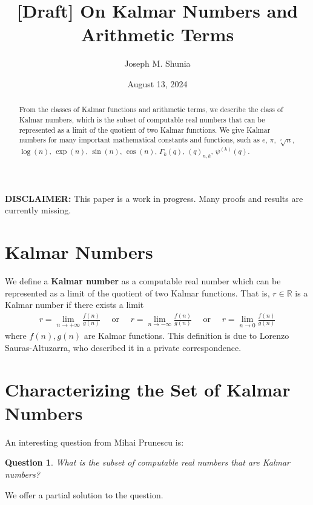 \documentclass[10pt,a4paper]{article}
\title{[Draft] On Kalmar Numbers and Arithmetic Terms}
\author{Joseph M. Shunia}
\date{August 13, 2024}
\theoremstyle{plain}
\newtheorem{question}{Question}[section]
\begin{document}
\maketitle

\begin{abstract}
\noindent From the classes of Kalmar functions and arithmetic terms, we describe the class of Kalmar numbers, which is the subset of computable real numbers that can be represented as a limit of the quotient of two Kalmar functions. We give Kalmar numbers for many important mathematical constants and functions, such as $e$, $\pi$, $\sqrt[r]{n}$, $\log(n)$, $\exp(n)$, $\sin(n)$, $\cos(n)$, $\Gamma_k(q)$, $(q)_{n,k}$, $\psi^{(k)}(q)$.
\end{abstract}

\textbf{DISCLAIMER:} This paper is a work in progress. Many proofs and results are currently missing.

\section{Kalmar Numbers}
We define a \textbf{Kalmar number} as a computable real number which can be represented as a limit of the quotient of two Kalmar functions. That is, $r \in \mathbb{R}$ is a Kalmar number if there exists a limit
\begin{align*}
r = \lim_{n \to +\infty} \frac{f(n)}{g(n)}
\quad \text{ or } \quad 
r = \lim_{n \to -\infty} \frac{f(n)}{g(n)}
\quad \text{ or } \quad 
r = \lim_{n \to 0} \frac{f(n)}{g(n)}
\end{align*}
where $f(n),g(n)$ are Kalmar functions. This definition is due to Lorenzo Sauras-Altuzarra, who described it in a private correspondence.

\section{Characterizing the Set of Kalmar Numbers}
An interesting question from Mihai Prunescu is:
\begin{question}
What is the subset of computable real numbers that are Kalmar numbers?
\end{question}
We offer a partial solution to the question.
\end{document}
